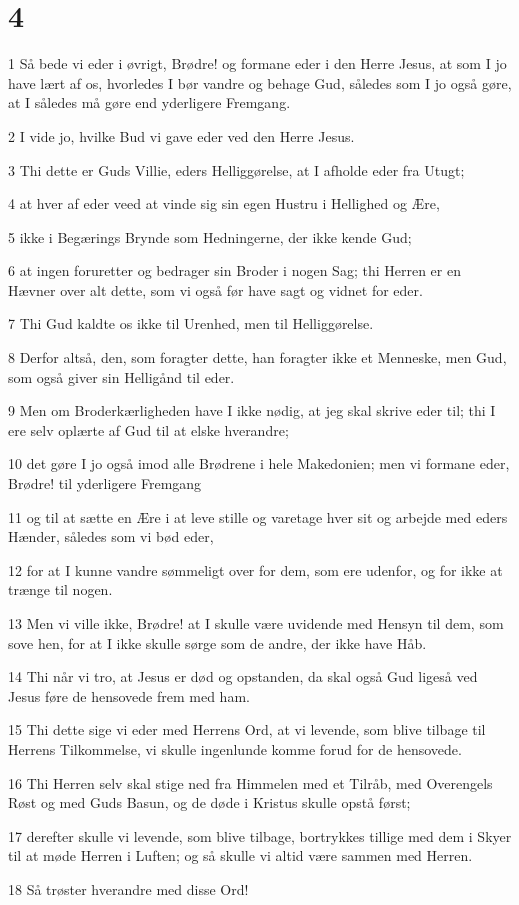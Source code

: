 \chapter{4}

\par 1 Så bede vi eder i øvrigt, Brødre! og formane eder i den Herre Jesus, at som I jo have lært af os, hvorledes I bør vandre og behage Gud, således som I jo også gøre, at I således må gøre end yderligere Fremgang.
\par 2 I vide jo, hvilke Bud vi gave eder ved den Herre Jesus.
\par 3 Thi dette er Guds Villie, eders Helliggørelse, at I afholde eder fra Utugt;
\par 4 at hver af eder veed at vinde sig sin egen Hustru i Hellighed og Ære,
\par 5 ikke i Begærings Brynde som Hedningerne, der ikke kende Gud;
\par 6 at ingen foruretter og bedrager sin Broder i nogen Sag; thi Herren er en Hævner over alt dette, som vi også før have sagt og vidnet for eder.
\par 7 Thi Gud kaldte os ikke til Urenhed, men til Helliggørelse.
\par 8 Derfor altså, den, som foragter dette, han foragter ikke et Menneske, men Gud, som også giver sin Helligånd til eder.
\par 9 Men om Broderkærligheden have I ikke nødig, at jeg skal skrive eder til; thi I ere selv oplærte af Gud til at elske hverandre;
\par 10 det gøre I jo også imod alle Brødrene i hele Makedonien; men vi formane eder, Brødre! til yderligere Fremgang
\par 11 og til at sætte en Ære i at leve stille og varetage hver sit og arbejde med eders Hænder, således som vi bød eder,
\par 12 for at I kunne vandre sømmeligt over for dem, som ere udenfor, og for ikke at trænge til nogen.
\par 13 Men vi ville ikke, Brødre! at I skulle være uvidende med Hensyn til dem, som sove hen, for at I ikke skulle sørge som de andre, der ikke have Håb.
\par 14 Thi når vi tro, at Jesus er død og opstanden, da skal også Gud ligeså ved Jesus føre de hensovede frem med ham.
\par 15 Thi dette sige vi eder med Herrens Ord, at vi levende, som blive tilbage til Herrens Tilkommelse, vi skulle ingenlunde komme forud for de hensovede.
\par 16 Thi Herren selv skal stige ned fra Himmelen med et Tilråb, med Overengels Røst og med Guds Basun, og de døde i Kristus skulle opstå først;
\par 17 derefter skulle vi levende, som blive tilbage, bortrykkes tillige med dem i Skyer til at møde Herren i Luften; og så skulle vi altid være sammen med Herren.
\par 18 Så trøster hverandre med disse Ord!

